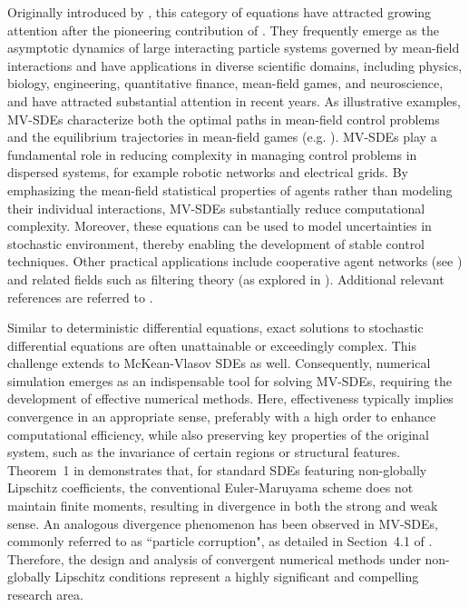\documentclass[12pt]{article}
\numberwithin{equation}{section}
\begin{document}
 Originally introduced by  \cite{mckean1966class, mckean1967propagation}, this category of equations    have  attracted growing attention after the pioneering contribution of  \cite{dawson1983critical}.   They frequently emerge as the asymptotic dynamics of large  interacting particle systems governed by mean-field interactions and   have  applications  in diverse scientific domains, including physics, biology, engineering, quantitative finance, mean-field games, and neuroscience, and have attracted substantial attention in recent years.  
As illustrative examples, MV-SDEs characterize both the optimal paths in mean-field control problems \cite{bensoussan2013mean, sznitman1991topics} and the equilibrium trajectories in mean-field games (e.g.  \cite{ mishura2020existence, wu2022stabilization}). MV-SDEs play a fundamental role in reducing complexity in managing control problems in dispersed systems, for example robotic networks and electrical grids. By emphasizing the mean-field statistical properties of agents rather than modeling their individual interactions, MV-SDEs substantially reduce computational complexity. Moreover, these equations can be used to model  uncertainties in stochastic environment, thereby enabling the development of stable control techniques.  Other practical applications include cooperative agent networks (see \cite{benachour1998nonlinear, bossy1997stochastic}) and related fields such as filtering theory (as explored in \cite{crisan2010approximate}). Additional relevant references  are referred to  \cite{baladron2012mean, bolley2011stochastic, bossy2015clarification, dreyer2011phase, guhlke2018stochastic, mckean1966class}. 


Similar to deterministic differential equations, exact solutions to stochastic differential equations are often unattainable or exceedingly complex. This challenge extends to McKean-Vlasov SDEs as well. Consequently, numerical simulation emerges as an indispensable tool for solving MV-SDEs, requiring the development of effective numerical methods. Here, effectiveness typically implies convergence in an appropriate sense, preferably with a high order to enhance computational efficiency, while also preserving key properties of the original system, such as the invariance of certain regions or structural features.
Theorem~1 in \cite{hutzenthaler2011strong} demonstrates that, for standard SDEs featuring non-globally Lipschitz coefficients, the conventional Euler-Maruyama scheme does not maintain finite moments, resulting in divergence in both the strong and weak sense. An analogous divergence phenomenon has been observed in MV-SDEs, commonly referred to as “particle corruption", as detailed in Section~4.1 of \cite{dos2022simulation}. Therefore, the design and analysis of convergent numerical methods under non-globally Lipschitz conditions represent a highly significant and compelling research area.
\end{document}
